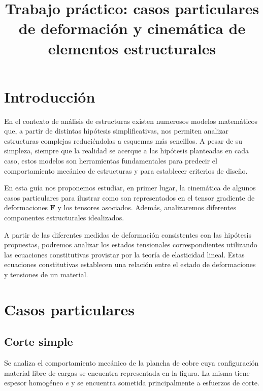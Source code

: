 \documentclass[12pt]{article}
\title{Trabajo práctico: casos particulares de deformación y cinemática de elementos estructurales}
\date{}
\newcommand{\vc}[1]{\mathbf{#1}}
\begin{document}
\maketitle

\section*{Introducción}

En el contexto de análisis de estructuras existen numerosos modelos matemáticos que, a partir de distintas hipótesis simplificativas, nos permiten analizar estructuras complejas reduciéndolas a esquemas más sencillos. A pesar de su simpleza, siempre que la realidad se acerque a las hipótesis planteadas en cada caso, estos modelos son herramientas fundamentales para predecir el comportamiento mecánico de estructuras y para establecer criterios de diseño. 

En esta guía nos proponemos estudiar, en primer lugar, la cinemática de algunos casos particulares para ilustrar como son representados en el tensor gradiente de deformaciones $\vc F$ y los tensores asociados. Además, analizaremos diferentes componentes estructurales idealizados.

A partir de las diferentes medidas de deformación consistentes con las hipótesis propuestas, podremos analizar los estados tensionales correspondientes utilizando las ecuaciones constitutivas provistar por la teoría de elasticidad lineal. Estas ecuaciones constitutivas establecen una relación entre el estado de deformaciones y tensiones de un material.


\section{Casos particulares}

\subsection{Corte simple}

Se analiza el comportamiento mecánico de la plancha de cobre cuya configuración material libre de cargas se encuentra representada en la figura. La misma tiene espesor homogéneo $e$ y se encuentra sometida principalmente a esfuerzos de corte. 
\begin{figure}[h!]
	\centering
\end{figure}
\end{document}
